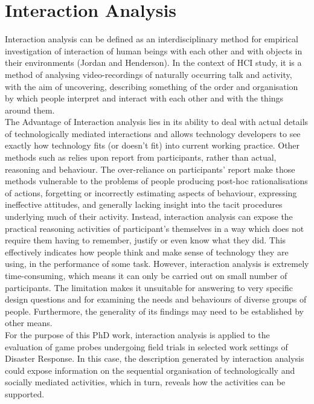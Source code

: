 \section{Interaction Analysis}
Interaction analysis can be defined as an interdisciplinary method for empirical investigation of interaction of human beings with each other and with objects in their environments (Jordan and Henderson). In the context of HCI study, it is a method of analysing video-recordings of naturally occurring talk and activity, with the aim of uncovering, describing something of the order and organisation by which people interpret and interact with each other and with the things around them.\\

The Advantage of Interaction analysis lies in its ability to deal with actual details of technologically mediated interactions and allows technology developers to see exactly how technology fits (or doesn't fit) into current working practice. Other methods such as relies upon report from participants, rather than actual, reasoning and behaviour. The over-reliance on participants' report make those methods vulnerable to the problems of people producing post-hoc rationalisations of actions, forgetting or incorrectly estimating aspects of behaviour, expressing ineffective attitudes, and generally lacking insight into the tacit procedures underlying much of their activity. Instead, interaction analysis can expose the practical reasoning activities of participant's themselves in a way which does not require them having to remember, justify or even know what they did. This effectively indicates how people think and make sense of technology they are using, in the performance of some task. However, interaction analysis is extremely time-consuming, which means it can only be carried out on small number of participants. The limitation makes it unsuitable for answering to very specific design questions and for examining the needs and behaviours of diverse groups of people. Furthermore, the generality of its findings may need to be established by other means.\\

For the purpose of this PhD work, interaction analysis is applied to the evaluation of game probes undergoing field trials in selected work settings of Disaster Response. In this case, the description generated by interaction analysis could expose information on the sequential organisation of technologically and socially mediated activities, which in turn, reveals how the activities can be supported.\\
